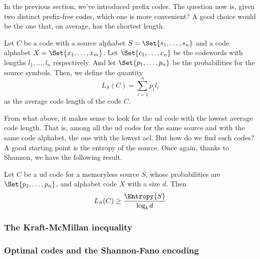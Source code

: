 \documentclass{subfiles}
\begin{document}
    In the previous section, we've introduced prefix codes. 
    The question now is, given two distinct prefix-free codes,
        which one is more convenient?
        A good choice would be the one that, on average,
        has the shortest length.

    \begin{definition*}
        Let \(C\) be a code with a source alphabet \(S = \Set{s_{1}, \ldots, s_{n}}\)
        and a code alphabet \(X = \Set{x_{1}, \ldots, x_{m}}\). 
        Let \(\Set{c_{1}, \ldots, c_{n}}\) be the codewords with lengths 
        \(l_{1}, \ldots, l_{n}\) respectively. And let \(\Set{p_{1}, \ldots, p_{n}}\)
        be the probabilities for the source symbols. 
            Then, we define the quantity
            \[
                L_{S}(C) = \sum_{i = 1}^{n}{p_{i} l_{i}}
            \]
            as the average code length of the code \(C\).
    \end{definition*}
    From what above, it makes sense to look for the \gls{ud} code with the lowest average code length.
    That is, among all the \gls{ud} codes for the same source and with the same code alphabet,
    the one with the lowest \gls{acl}. But how do we find such codes?
    A good starting point is the entropy of the source. Once again, 
    thanks to Shannon, we have the following result.
    \begin{theorem*}[Shannon]
        Let \(C\) be a \gls{ud} code for a memoryless source \(S\),
        whose probabilities are \(\Set{p_{1}, \ldots, p_{n}}\),
        and alphabet code \(X\) with a size \(d\). 
        Then 
        \[
            L_{S}(C) \ge \frac{\Entropy{S}}{\log_{b}{d}}
        \]
    \end{theorem*}

    \subsubsection{The Kraft-McMillan inequality}
    

    \subsubsection{Optimal codes and the Shannon-Fano encoding}
    
\end{document}
